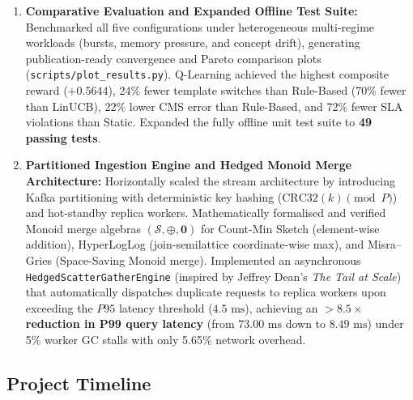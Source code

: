 \begin{enumerate}
 \item \textbf{Comparative Evaluation and Expanded Offline Test Suite:}
 Benchmarked all five configurations under heterogeneous multi-regime workloads (bursts, memory pressure, and concept drift), generating publication-ready convergence and Pareto comparison plots (\texttt{scripts/plot\_results.py}). Q-Learning achieved the highest composite reward ($+0.5644$), 24\% fewer template switches than Rule-Based (70\% fewer than LinUCB), 22\% lower CMS error than Rule-Based, and 72\% fewer SLA violations than Static. Expanded the fully offline unit test suite to \textbf{49 passing tests}.

 \item \textbf{Partitioned Ingestion Engine and Hedged Monoid Merge Architecture:}
 Horizontally scaled the stream architecture by introducing Kafka partitioning with deterministic key hashing ($\text{CRC32}(k) \pmod P$) and hot-standby replica workers. Mathematically formalised and verified Monoid merge algebras $(\mathcal{S}, \oplus, \mathbf{0})$ for Count-Min Sketch (element-wise addition), HyperLogLog (join-semilattice coordinate-wise max), and Misra--Gries (Space-Saving Monoid merge). Implemented an asynchronous \texttt{HedgedScatterGatherEngine} (inspired by Jeffrey Dean's \textit{The Tail at Scale}) that automatically dispatches duplicate requests to replica workers upon exceeding the $P95$ latency threshold ($4.5\text{ ms}$), achieving an \textbf{$>8.5\times$ reduction in P99 query latency} (from $73.00\text{ ms}$ down to $8.49\text{ ms}$) under 5\% worker GC stalls with only 5.65\% network overhead.
\end{enumerate}

\subsection{Project Timeline}

